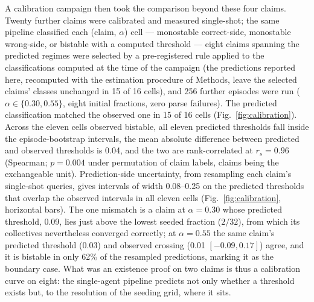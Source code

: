 \documentclass[11pt]{article}
\begin{document}
A calibration campaign then took the comparison beyond these four claims.
Twenty further claims were calibrated and measured single-shot; the same
pipeline classified each (claim, $\alpha$) cell --- monostable correct-side,
monostable wrong-side, or bistable with a computed threshold --- eight claims
spanning the predicted regimes were selected by a pre-registered rule applied
to the classifications computed at the time of the campaign (the predictions
reported here, recomputed with the estimation procedure of Methods, leave the
selected claims' classes unchanged in 15 of 16 cells), and
256 further episodes were run ($\alpha \in \{0.30, 0.55\}$, eight initial
fractions, zero parse failures). The predicted classification matched the
observed one in 15 of 16 cells (Fig.~\ref{fig:calibration}). Across the
eleven cells observed bistable, all eleven predicted thresholds fall inside
the episode-bootstrap intervals, the mean absolute difference between
predicted and observed thresholds is 0.04, and the two are rank-correlated at
$r_s = 0.96$ (Spearman; $p = 0.004$ under permutation of claim labels, claims
being the exchangeable unit). Prediction-side uncertainty, from resampling
each claim's single-shot queries, gives intervals of width 0.08--0.25 on the
predicted thresholds that overlap the observed intervals in all eleven cells
(Fig.~\ref{fig:calibration}, horizontal bars). The one mismatch is a claim at
$\alpha = 0.30$ whose predicted threshold, 0.09, lies just above the lowest
seeded fraction ($2/32$), from which its collectives nevertheless converged
correctly; at $\alpha = 0.55$ the same claim's predicted threshold (0.03) and
observed crossing (0.01 $[-0.09, 0.17]$) agree, and it is bistable in only
62\% of the resampled predictions, marking it as the boundary case. What was
an existence proof on two claims is thus a calibration curve on eight: the
single-agent pipeline predicts not only whether a threshold exists but, to
the resolution of the seeding grid, where it sits.
\end{document}
